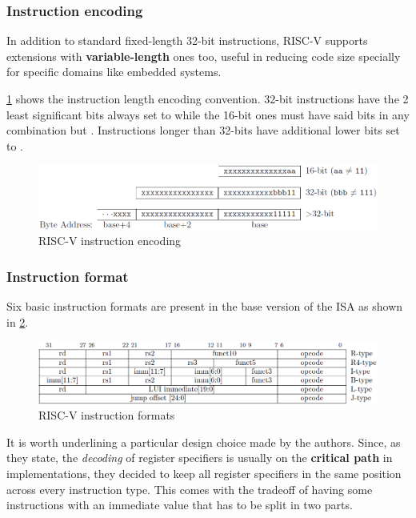 \documentclass[12pt,oneside,a4paper]{article}
\begin{document}
\subsubsection{Instruction encoding}
In addition to standard fixed-length 32-bit instructions, RISC-V supports extensions with \textbf{variable-length} ones too, useful in reducing code size specially for specific domains like embedded systems.

\cref{riscv:encoding} shows the instruction length encoding convention. 32-bit instructions have the 2 least significant bits always set to {\selectfont{1}} while the 16-bit ones must have said bits in any combination but {\selectfont{11}}.
Instructions longer than 32-bits have additional lower bits set to {\selectfont{1}}.\medskip

\begin{figure}[h]
	\centering
	\includegraphics[scale=0.65]{risc-v_encoding}
	\caption{RISC-V instruction encoding}
	\label{riscv:encoding}
\end{figure}

\subsubsection{Instruction format}
Six basic instruction formats are present in the base version of the ISA as shown in \cref{riscv:format}.

\begin{figure}[h]
	\centering
	\includegraphics[scale=0.65]{risc-v_format}
	\caption{RISC-V instruction formats}
	\label{riscv:format}
\end{figure}

It is worth underlining a particular design choice made by the authors. Since, as they state, the \textit{decoding} of register specifiers is usually on the \textbf{critical path} in implementations, they decided to keep all register specifiers in the same position across every instruction type. This comes with the tradeoff of having some instructions with an immediate value that has to be split in two parts.
\end{document}
